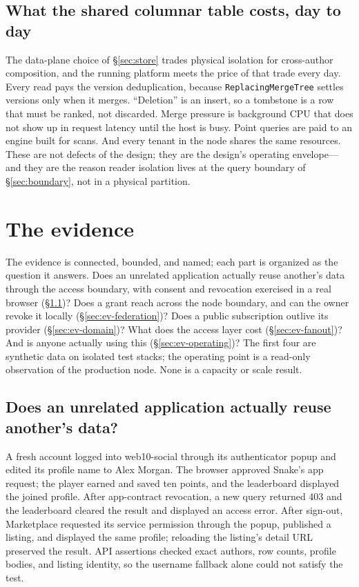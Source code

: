 \documentclass[sigconf, nonacm]{acmart}
\begin{document}
\subsection{What the shared columnar table costs, day to day}

The data-plane choice of \S\ref{sec:store} trades physical isolation
for cross-author composition, and the running platform meets the price
of that trade every day. Every read pays the version deduplication,
because \texttt{ReplacingMergeTree} settles versions only when it
merges. ``Deletion'' is an insert, so a tombstone is a row that must be
ranked, not discarded. Merge pressure is background CPU that does not
show up in request latency until the host is busy. Point queries are
paid to an engine built for scans. And every tenant in the node shares
the same resources. These are not defects of the design; they are the
design's operating envelope---and they are the reason
reader isolation lives at the query boundary of \S\ref{sec:boundary},
not in a physical partition.

\section{The evidence}
\label{sec:evidence}

The evidence is connected, bounded, and named; each part is organized as
the question it answers. Does an unrelated application actually reuse
another's data through the access boundary, with consent and revocation
exercised in a real browser (\S\ref{sec:ev-interop})? Does a grant reach
across the node boundary, and can the owner revoke it locally
(\S\ref{sec:ev-federation})? Does a public subscription outlive its
provider (\S\ref{sec:ev-domain})? What does the access layer cost
(\S\ref{sec:ev-fanout})? And is anyone actually using this
(\S\ref{sec:ev-operating})? The first four are synthetic data on
isolated test stacks; the operating point is a read-only observation of
the production node. None is a capacity or scale result.

\subsection{Does an unrelated application actually reuse another's data?}
\label{sec:ev-interop}

A fresh account logged into web10-social through its authenticator popup
and edited its profile name to Alex Morgan. The browser approved Snake's
app request; the player earned and saved ten points, and the leaderboard
displayed the joined profile. After app-contract revocation, a new query
returned 403 and the leaderboard cleared the result and displayed an
access error. After sign-out, Marketplace requested its service
permission through the popup, published a listing, and displayed the same
profile; reloading the listing's detail URL preserved the result. API
assertions checked exact authors, row counts, profile bodies, and
listing identity, so the username fallback alone could not satisfy the
test.
\end{document}

